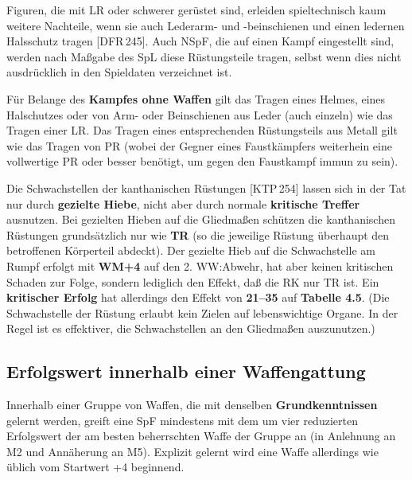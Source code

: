 \documentclass[10pt,a4paper,germanpar]{article}
\begin{document}
Figuren, die mit LR oder schwerer gerüstet sind, erleiden
spieltechnisch kaum weitere Nachteile, wenn sie auch Lederarm- und
-beinschienen und einen ledernen Halsschutz tragen [DFR\,245]. Auch
NSpF, die auf einen Kampf eingestellt sind, werden nach Maßgabe des
SpL diese Rüstungsteile tragen, selbst wenn dies nicht ausdrücklich in
den Spieldaten verzeichnet ist.

Für Belange des \textbf{Kampfes ohne Waffen} gilt das Tragen eines
Helmes, eines Halschutzes oder von Arm- oder Beinschienen aus Leder
(auch einzeln) wie das Tragen einer LR. Das Tragen eines
entsprechenden Rüstungsteils aus Metall gilt wie das Tragen von PR
(wobei der Gegner eines Faustkämpfers weiterhein eine vollwertige PR
oder besser benötigt, um gegen den Faustkampf immun zu sein).

Die Schwachstellen der kanthanischen Rüstungen [KTP\,254] lassen
sich in der Tat nur durch \textbf{gezielte Hiebe}, nicht aber durch
normale \textbf{kritische Treffer} ausnutzen. Bei gezielten Hieben auf
die Gliedmaßen schützen die kanthanischen Rüstungen grundsätzlich nur
wie \textbf{TR} (so die jeweilige Rüstung überhaupt den betroffenen
Körperteil abdeckt). Der gezielte Hieb auf die Schwachstelle am Rumpf
erfolgt mit \textbf{WM+4} auf den 2. WW:Abwehr, hat aber keinen
kritischen Schaden zur Folge, sondern lediglich den Effekt, daß die RK
nur TR ist. Ein \textbf{kritischer Erfolg} hat allerdings den Effekt
von \textbf{21--35} auf \textbf{Tabelle 4.5}. (Die Schwachstelle der
Rüstung erlaubt kein Zielen auf lebenswichtige Organe. In der Regel
ist es effektiver, die Schwachstellen an den Gliedmaßen auszunutzen.)

% 

\subsection{Erfolgswert innerhalb einer Waffengattung}

Innerhalb einer Gruppe von Waffen, die mit denselben
\textbf{Grundkenntnissen} gelernt werden, greift eine SpF mindestens
mit dem um vier reduzierten Erfolgswert der am besten beherrschten
Waffe der Gruppe an (in Anlehnung an M2 und Annäherung an
M5). Explizit gelernt wird eine Waffe allerdings wie üblich vom
Startwert +4 beginnend.
\end{document}

